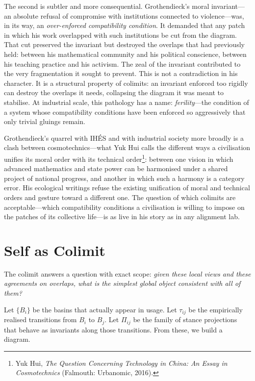 The second is subtler and more consequential. Grothendieck's moral invariant---an absolute refusal of compromise with institutions connected to violence---was, in its way, an \emph{over-enforced compatibility condition}. It demanded that any patch in which his work overlapped with such institutions be cut from the diagram. That cut preserved the invariant but destroyed the overlaps that had previously held: between his mathematical community and his political conscience, between his teaching practice and his activism. The zeal of the invariant contributed to the very fragmentation it sought to prevent. This is not a contradiction in his character. It is a structural property of colimits: an invariant enforced too rigidly can destroy the overlaps it needs, collapsing the diagram it was meant to stabilise. At industrial scale, this pathology has a name: \emph{ferility}---the condition of a system whose compatibility conditions have been enforced so aggressively that only trivial gluings remain.

Grothendieck's quarrel with IH\'{E}S and with industrial society more broadly is a clash between cosmotechnics---what Yuk Hui calls the different ways a civilisation unifies its moral order with its technical order\footnote{Yuk Hui, \emph{The Question Concerning Technology in China: An Essay in Cosmotechnics} (Falmouth: Urbanomic, 2016).}: between one vision in which advanced mathematics and state power can be harmonised under a shared project of national progress, and another in which such a harmony is a category error. His ecological writings refuse the existing unification of moral and technical orders and gesture toward a different one. The question of which colimits are acceptable---which compatibility conditions a civilisation is willing to impose on the patches of its collective life---is as live in his story as in any alignment lab.


\section{Self as Colimit}

The colimit answers a question with exact scope: \emph{given these local views and these agreements on overlaps, what is the simplest global object consistent with all of them?}

Let $\{B_i\}$ be the basins that actually appear in usage. Let $\tau_{ij}$ be the empirically realised transitions from $B_i$ to $B_j$. Let $\Pi_{ij}$ be the family of stance projections that behave as invariants along those transitions. From these, we build a diagram.

